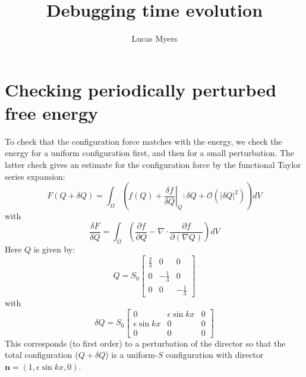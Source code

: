 \documentclass[reqno]{article}
\begin{document}
\title{Debugging time evolution}
\author{Lucas Myers}
\maketitle

\section{Checking periodically perturbed free energy}
To check that the configuration force matches with the energy, we check the energy for a uniform configuration first, and then for a small perturbation.
The latter check gives an estimate for the configuration force by the functional Taylor series expansion:
\begin{equation}
    F(Q + \delta Q)
    =
    \int_\Omega
    \left(
    f(Q)
    + \left. \frac{\delta f}{\delta Q} \right|_Q : \delta Q + \mathcal{O}\left(\left| \delta Q \right|^2 \right)
    \right)
    dV
\end{equation}
with
\begin{equation}
    \frac{\delta F}{\delta Q}
    =
    \int_\Omega
    \left(
    \frac{\partial f}{\partial Q}
    - \nabla \cdot \frac{\partial f}{\partial \left( \nabla Q \right)}
    \right)
    dV
\end{equation}
Here $Q$ is given by:
\begin{equation}
    Q
    =
    S_0
    \begin{bmatrix}
        \tfrac23 &0 &0 \\
        0 &-\tfrac13 &0 \\
        0 &0 &-\tfrac13
    \end{bmatrix}
\end{equation}
with
\begin{equation}
    \delta Q
    =
    S_0
    \begin{bmatrix}
        0 &\epsilon \sin kx &0 \\
        \epsilon \sin kx &0 &0 \\
        0 &0 &0
    \end{bmatrix}
\end{equation}
This corresponds (to first order) to a perturbation of the director so that the total configuration ($Q + \delta Q$) is a uniform-$S$ configuration with director $\mathbf{n} = (1, \epsilon \sin kx, 0)$.
\end{document}
